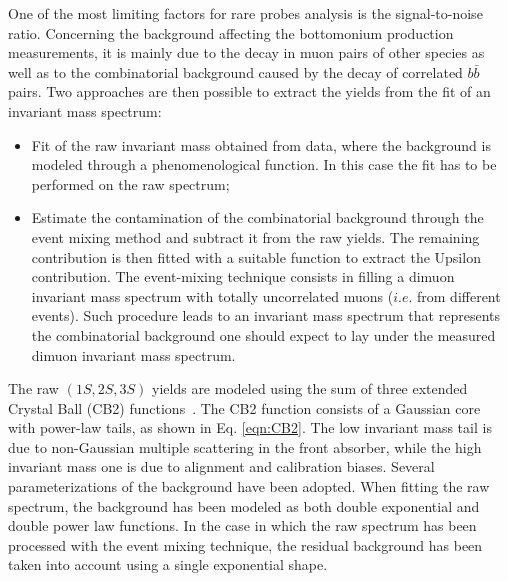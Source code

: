 One of the most limiting factors for rare probes analysis is the signal-to-noise ratio.
Concerning the background affecting the bottomonium production measurements, it is mainly due to the decay in muon pairs of other species as well as to the combinatorial background caused by the decay of correlated $b\bar{b}$ pairs.
Two approaches are then possible to extract the yields from the fit of an invariant mass spectrum:
\begin{itemize}
\item Fit of the raw invariant mass obtained from data, where the background is modeled through a phenomenological function. In this case the fit has to be performed on the raw spectrum;
\item Estimate the contamination of the combinatorial background through the event mixing method and subtract it from the raw yields. The remaining contribution is then fitted with a suitable function to extract the Upsilon contribution. The event-mixing technique consists in filling a dimuon invariant mass spectrum with totally uncorrelated muons ($i.e.$ from different events). Such procedure leads to an invariant mass spectrum that represents the combinatorial background one should expect to lay under the measured dimuon invariant mass spectrum.
\end{itemize}

The raw \upsi$(1S,2S,3S)$ yields are modeled using the sum of three extended Crystal Ball (CB2) functions~\cite{ALICE-Quarkonia-signal-extraction}. 
The CB2 function consists of a Gaussian core with  power-law tails, as shown in Eq. \ref{eqn:CB2}.
The low invariant mass tail is due to non-Gaussian multiple scattering in the front absorber, while the high invariant mass one is due to alignment and calibration biases.
Several parameterizations of the background have been adopted.
When fitting the raw spectrum, the background has been modeled as both double exponential and double power law functions.
In the case in which the raw spectrum has been processed with the event mixing technique, the residual background has been taken into account using a single exponential shape.

